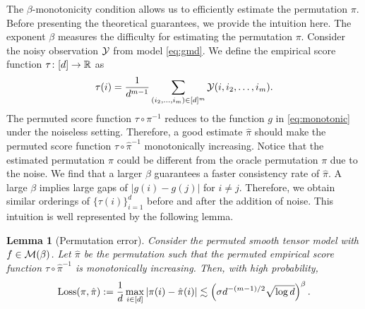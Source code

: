 \documentclass[11pt]{article}
\newtheorem{lem}{Lemma}
\theoremstyle{definition}
\begin{document}
The $\beta$-monotonicity condition allows us to efficiently estimate the permutation $\pi$. Before presenting the theoretical guarantees, we provide the intuition here. The exponent $\beta$ measures the difficulty for estimating the permutation $\pi$. Consider the noisy observation $\mathcal{Y}$ from model \eqref{eq:gmd}.
We define the empirical score function $\tau\colon [d]\rightarrow\mathbb{R}$ as
\begin{align}\label{eq:score}
    \tau(i) = \frac{1}{d^{m-1}}\sum_{(i_2,\ldots,i_m)\in[d]^m} \mathcal{Y}(i,i_2,\ldots,i_m).
\end{align}
The permuted score function $\tau\circ\pi^{-1}$ reduces to the function $g$ in \eqref{eq:monotonic} under the noiseless setting.
Therefore, a good estimate $\hat\pi$ should make the permuted score function $\tau\circ\hat\pi^{-1}$ monotonically increasing. Notice that the estimated permutation $\hat\pi$ could be different from the oracle permutation $\pi$ due to the noise. We find that a larger $\beta$ guarantees a faster consistency rate of $\hat\pi$. A large $\beta$ implies large gaps of $|g(i)-g(j)|$ for $i\neq j$. Therefore, we obtain similar orderings of $\{\tau(i)\}_{i=1}^d$ before and after the addition of noise. This intuition is well represented by the following lemma.
\begin{lem}[Permutation error]\label{lem:permute}
Consider the permuted smooth tensor model with $f\in \mathcal{M}(\beta)$. Let $\hat\pi$ be the permutation such that the permuted empirical score function $\tau\circ \hat\pi^{-1}$ is monotonically increasing. Then, with high probability, 
\begin{align}
    \textup{Loss}(\pi,\hat\pi):= \frac{1}{d}\max_{i\in[d]}|\pi(i)-\hat\pi(i)|\lesssim \left(\sigma d^{-(m-1)/2}\sqrt{\log d}\right)^{\beta}.
\end{align}
\end{lem}
\end{document}
